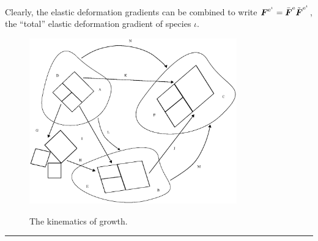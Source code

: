 \noindent Clearly, the elastic deformation gradients can be
combined to write $\mbox{\boldmath$ F$}^{\mathrm{e}^\iota} =
\bar{\mbox{\boldmath$ F$}}^\mathrm{e}\tilde{\mbox{\boldmath$ F$}}^{\mathrm{e}^\iota}$, the ``total''
elastic deformation gradient of species $\iota$.
\begin{figure}[ht]
 
 
 
   
    \centering
{\includegraphics[width=0.8\textwidth]
  {images/elucidation/kinematics}}
\caption{The kinematics of growth.} \label{growthkinematicsfig}
\end{figure}

\hrule

